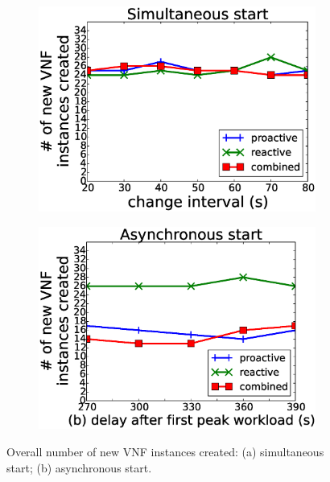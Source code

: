 \begin{figure}[!t]
  \begin{subfigure}[t]{0.49\linewidth}
   \centering
   \includegraphics[width=\columnwidth]{chap-scalims/figure/nf-creation1.eps}
  \end{subfigure}
  \begin{subfigure}[t]{0.49\linewidth}
     \centering
     \includegraphics[width=\columnwidth]{chap-scalims/figure/nf-creation2.eps}
    \end{subfigure}
        \caption{Overall number of new VNF instances created: (a) simultaneous start; (b) asynchronous start.}
        \label{fig:nf-creation}
        \vspace{-4mm}
\end{figure}


